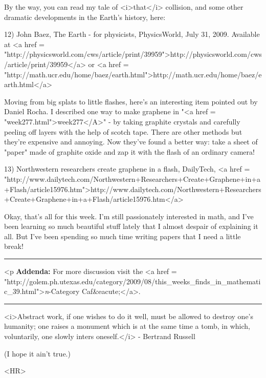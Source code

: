 By the way, you can read my tale of <i>that</i> collision,
and some other dramatic developments in the Earth's history, here:

12) John Baez, The Earth - for physicists, PhysicsWorld, July 31, 2009.
Available at <a href = "http://physicsworld.com/cws/article/print/39959">http://physicsworld.com/cws/article/print/39959</a> or
<a href = "http://math.ucr.edu/home/baez/earth.html">http://math.ucr.edu/home/baez/earth.html</a>

Moving from big splats to little flashes, here's an interesting item
pointed out by Daniel Rocha.  I described one way to make graphene in
"<a href = "week277.html">week277</A>" - by taking graphite
crystals and carefully peeling off layers with the help of scotch
tape.  There are other methods but they're expensive and annoying.
Now they've found a better way: take a sheet of "paper" made
of graphite oxide and zap it with the flash of an ordinary camera!

13) Northwestern researchers create graphene in a flash, DailyTech,
<a href = "http://www.dailytech.com/Northwestern+Researchers+Create+Graphene+in+a+Flash/article15976.htm">http://www.dailytech.com/Northwestern+Researchers+Create+Graphene+in+a+Flash/article15976.htm</a>

Okay, that's all for this week.  I'm still passionately interested in
math, and I've been learning so much beautiful stuff lately that I
almost despair of explaining it all.  But I've been spending so much
time writing papers that I need a little break!  

\par\noindent\rule{\textwidth}{0.4pt}
<p
\textbf{Addenda:} For more discussion visit the <a href =
"http://golem.ph.utexas.edu/category/2009/08/this_weeks_finds_in_mathematic_39.html">\emph{n}-Category
Caf&eacute;</a>.

\par\noindent\rule{\textwidth}{0.4pt}
<i>Abstract work, if one wishes to do it well, must be allowed to destroy
one's humanity; one raises a monument which is at the same time a tomb, 
in which, voluntarily, one slowly inters oneself.</i> - Bertrand Russell

(I hope it ain't true.)

<HR>



